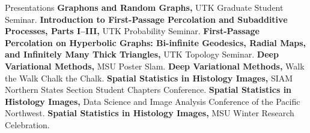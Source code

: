 \begin{rubric}{Presentations}
\entry*[2026] \textbf{Graphons and Random Graphs,} UTK Graduate Student Seminar.
\entry*[2025] \textbf{Introduction to First-Passage Percolation and Subadditive Processes, Parts I--III,} UTK Probability Seminar.
\entry*[2025] \textbf{First-Passage Percolation on Hyperbolic Graphs: Bi-infinite Geodesics, Radial Maps, and Infinitely Many Thick Triangles,} UTK Topology Seminar.
\entry*[2021] \textbf{Deep Variational Methods,} MSU Poster Slam.
\entry*[2021] \textbf{Deep Variational Methods,} Walk the Walk Chalk the Chalk.
\entry*[2020] \textbf{Spatial Statistics in Histology Images,} SIAM Northern States Section Student Chapters Conference.
\entry*[2020] \textbf{Spatial Statistics in Histology Images,} Data Science and Image Analysis Conference of the Pacific Northwest.
\entry*[2019] \textbf{Spatial Statistics in Histology Images,} MSU Winter Research Celebration.
\end{rubric}
